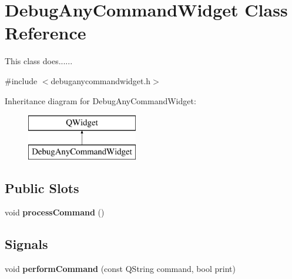 \hypertarget{class_debug_any_command_widget}{}\section{Debug\+Any\+Command\+Widget Class Reference}
\label{class_debug_any_command_widget}


This class does......  




{\ttfamily \#include $<$debuganycommandwidget.\+h$>$}

Inheritance diagram for Debug\+Any\+Command\+Widget\+:\begin{figure}[H]
\begin{center}
\leavevmode
\includegraphics[height=2.000000cm]{class_debug_any_command_widget}
\end{center}
\end{figure}
\subsection*{Public Slots}
\begin{DoxyCompactItemize}
\item 
\hypertarget{class_debug_any_command_widget_a40f05f6e08e933dc99528e9f92195354}{}void {\bfseries process\+Command} ()\label{class_debug_any_command_widget_a40f05f6e08e933dc99528e9f92195354}

\end{DoxyCompactItemize}
\subsection*{Signals}
\begin{DoxyCompactItemize}
\item 
\hypertarget{class_debug_any_command_widget_a74bd41fd02dddc2455ce27f9fa75547c}{}void {\bfseries perform\+Command} (const Q\+String command, bool print)\label{class_debug_any_command_widget_a74bd41fd02dddc2455ce27f9fa75547c}

\end{DoxyCompactItemize}
